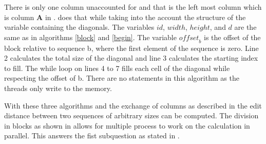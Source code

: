 There is only one column unaccounted for and that is the left most column which is column \textbf{A} in .
 does that while taking into the account the structure of the variable containing the diagonals.
The variables $id$, $width$, $height$, and $d$ are the same as in algorithms \ref{block} and \ref{begin}.
The variable $\mathit{offset}_b$ is the offset of the block relative to sequence b, where the first element of the sequence is zero.
Line 2 calculates the total size of the diagonal and line 3 calculates the starting index to fill.
The while loop on lines 4 to 7 fills each cell of the diagonal while respecting the offset of b.
There are no  statements in this algorithm as the threads only write to the memory.

With these three algorithms and the exchange of columns as described in  the edit distance between two sequences of arbitrary sizes can be computed.
The division in blocks as shown in  allows for multiple process to work on the calculation in parallel.
This answers the fist subquestion as stated in .

